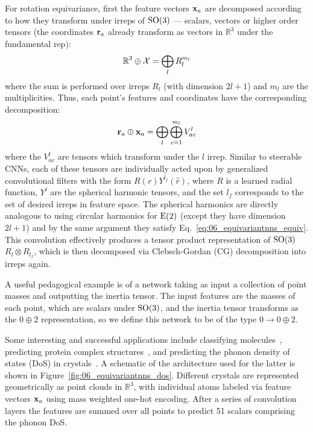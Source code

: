 For rotation equivariance, first the feature vectors $\mathbf{x}_a$ are decomposed according to how they transform under irreps of $\SO[3]$ --- scalars, vectors or higher order tensors (the coordinates $\mathbf{r}_a$ already transform as vectors in $\mathbb R^3$ under the fundamental rep): 
\begin{equation}
    \mathbb R^3 \oplus \mathcal{X} = \bigoplus _l R_l^{m_l}
\end{equation}
where the sum is performed over irreps $R_l$ (with dimension $2l+1$) and $m_l$ are the multiplicities. 
Thus, each point's features and coordinates have the corresponding decomposition:
\begin{equation}
    \mathbf{r}_a \oplus \mathbf{x}_a = \bigoplus _l \bigoplus _{c=1}^{m_l} V^l_{ac}
\end{equation}
where the $V^l_{ac}$ are tensors which transform under the $l$ irrep. 
Similar to steerable CNNs, each of these tensors are individually acted upon by generalized convolutional filters with the form $R(r)Y^{l_f}(\hat{r})$, where $R$ is a learned radial function, $Y^l$ are the spherical harmonic tensors, and the set $l_f$ corresponds to the set of desired irreps in feature space. The spherical harmonics are directly analogous to using circular harmonics for $\EE[2]$ (except they have dimension $2l+1$) and by the same argument they satisfy Eq.~\ref{eq:06_equivariantnns_equiv}. 
This convolution effectively produces a tensor product representation of $\SO[3]$ $R_{l} \otimes R_{l_f}$, which is then decomposed via Clebsch-Gordan (CG) decomposition into irreps again.

A useful pedagogical example is of a network taking as input a collection of point masses and outputting the inertia tensor. 
The input features are the masses of each point, which are scalars under $\SO[3]$, and the inertia tensor transforms as the $0 \oplus 2$ representation, so we define this network to be of the type $0 \rightarrow 0 \oplus 2$. 

Some interesting and successful applications include classifying molecules~\cite{miller2020relevance}, predicting protein complex structures~\cite{Eismann2020HierarchicalRN}, and predicting the phonon density of states (DoS) in crystals~\cite{chen2020direct}. 
A schematic of the architecture used for the latter is shown in Figure~\ref{fig:06_equivariantnns_dos}. 
Different crystals are represented geometrically as point clouds in $\mathbb R^3$, with individual atoms labeled via feature vectors $\mathbf{x}_a$ using mass weighted one-hot encoding. 
After a series of convolution layers the features are summed over all points to predict 51 scalars comprising the phonon DoS.


